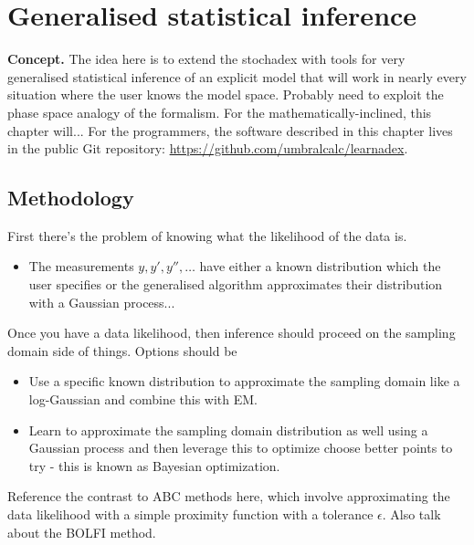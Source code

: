 \chapter{\sffamily Generalised statistical inference}

{\bfseries\sffamily Concept.} The idea here is to extend the stochadex with tools for very generalised statistical inference of an explicit model that will work in nearly every situation where the user knows the model space. Probably need to exploit the phase space analogy of the formalism. For the mathematically-inclined, this chapter will... For the programmers, the software described in this chapter lives in the public Git repository: \href{https://github.com/umbralcalc/learnadex}{https://github.com/umbralcalc/learnadex}.


\section{\sffamily Methodology}

First there's the problem of knowing what the likelihood of the data is.
\begin{itemize}
\item{The measurements $y, y', y'', \dots$ have either a known distribution which the user specifies or the generalised algorithm approximates their distribution with a Gaussian process...}
\end{itemize}
Once you have a data likelihood, then inference should proceed on the sampling domain side of things. Options should be
\begin{itemize}
\item{Use a specific known distribution to approximate the sampling domain like a log-Gaussian and combine this with EM.}
\item{Learn to approximate the sampling domain distribution as well using a Gaussian process and then leverage this to optimize choose better points to try - this is known as Bayesian optimization.} 
\end{itemize}

Reference the contrast to ABC methods here, which involve approximating the data likelihood with a simple proximity function with a tolerance $\epsilon$. Also talk about the BOLFI method.
